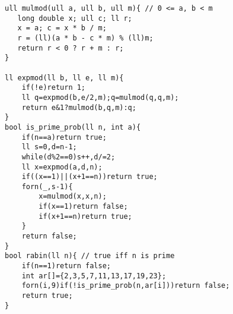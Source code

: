 \begin{verbatim}
ull mulmod(ull a, ull b, ull m){ // 0 <= a, b < m
   long double x; ull c; ll r;
   x = a; c = x * b / m;
   r = (ll)(a * b - c * m) % (ll)m;
   return r < 0 ? r + m : r;
}

ll expmod(ll b, ll e, ll m){
	if(!e)return 1;
	ll q=expmod(b,e/2,m);q=mulmod(q,q,m);
	return e&1?mulmod(b,q,m):q;
}
bool is_prime_prob(ll n, int a){
	if(n==a)return true;
	ll s=0,d=n-1;
	while(d%2==0)s++,d/=2;
	ll x=expmod(a,d,n);
	if((x==1)||(x+1==n))return true;
	forn(_,s-1){
		x=mulmod(x,x,n);
		if(x==1)return false;
		if(x+1==n)return true;
	}
	return false;
}
bool rabin(ll n){ // true iff n is prime
	if(n==1)return false;
	int ar[]={2,3,5,7,11,13,17,19,23};
	forn(i,9)if(!is_prime_prob(n,ar[i]))return false;
	return true;
}
\end{verbatim}